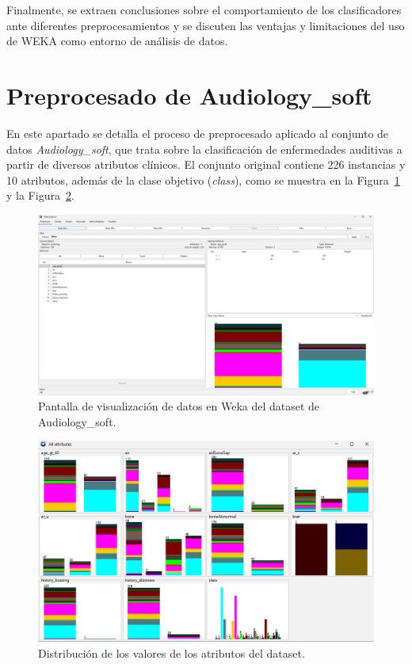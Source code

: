 \documentclass{article}
\begin{document}
Finalmente, se extraen conclusiones sobre el comportamiento de los clasificadores ante diferentes preprocesamientos y se discuten las ventajas y limitaciones del uso de WEKA como entorno de análisis de datos.\\

\section{Preprocesado de Audiology\_soft}

En este apartado se detalla el proceso de preprocesado aplicado al conjunto de datos \textit{Audiology\_soft}, que trata sobre la clasificación de enfermedades auditivas a partir de diversos atributos clínicos. El conjunto original contiene 226 instancias y 10 atributos, además de la clase objetivo (\textit{class}), como se muestra en la Figura~\ref{fig:audiology-soft} y la Figura~\ref{fig:attributes-audiology}.

\begin{figure}[!ht]
    \centering
    \includegraphics[width=0.9\linewidth]{Imágenes/audiology_init.png}
    \caption{Pantalla de visualización de datos en Weka del dataset de Audiology\_soft.}
    \label{fig:audiology-soft}
\end{figure}

\begin{figure}[!ht]
    \centering
    \includegraphics[width=0.9\linewidth]{Imágenes/atributos_dataset_audiology.png}
    \caption{Distribución de los valores de los atributos del dataset.}
    \label{fig:attributes-audiology}
\end{figure}
\end{document}
